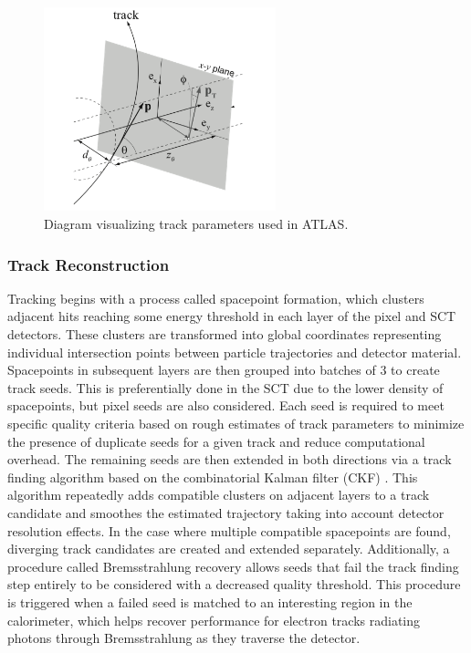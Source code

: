 \begin{figure}
\centering
    \includegraphics[width=0.6\textwidth]{images/Impact_Parameters.png}
    \caption{Diagram visualizing track parameters used in ATLAS.}
    \label{fig:Impact_Parameters}
\end{figure}

\subsubsection*{Track Reconstruction}

Tracking begins with a process called spacepoint formation, which clusters adjacent hits reaching some energy 
threshold in each layer of the pixel and SCT detectors. These clusters are transformed into global coordinates 
representing individual intersection points between particle trajectories and detector material. Spacepoints in 
subsequent layers are then grouped into batches of 3 to create track seeds. This is preferentially done in the SCT 
due to the lower density of spacepoints, but pixel seeds are also considered. Each seed is required to meet specific 
quality criteria based on rough estimates of track parameters to minimize the presence of duplicate seeds for a given 
track and reduce computational overhead. The remaining seeds are then extended in both directions via a track 
finding algorithm based on the combinatorial Kalman filter (CKF) \cite{fruehwirt-kalman-filter}. This algorithm 
repeatedly adds compatible clusters on adjacent layers to a track candidate and smoothes the estimated trajectory 
taking into account detector resolution effects. In the case where multiple compatible spacepoints are found, 
diverging track candidates are created and extended separately. Additionally, a procedure called Bremsstrahlung 
recovery allows seeds that fail the track finding step entirely to be considered with a decreased quality threshold. 
This procedure is triggered when a failed seed is matched to an interesting region in the calorimeter, which helps 
recover performance for electron tracks radiating photons through Bremsstrahlung as they traverse the detector. \par

